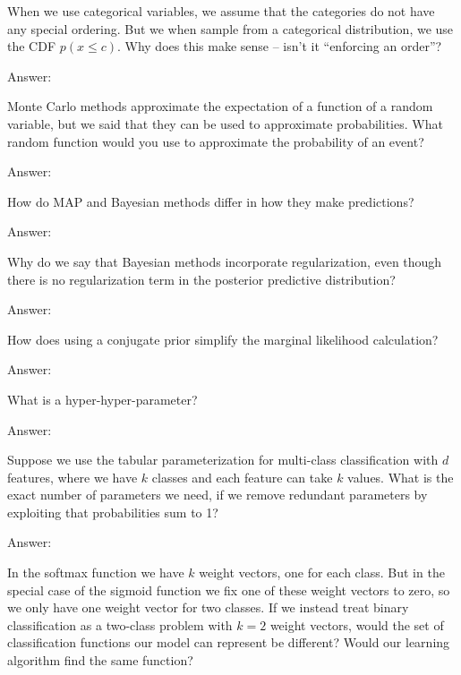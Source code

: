 \documentclass{article}
\newcommand{\ask}[1]{\textcolor{question}{#1}}
\newenvironment{answer}{\par\begingroup\color{answer}Answer: }{\endgroup}
\newcommand{\TODO}{\color{red}{TODO}}
\begin{document}
\begin{qlist}
\item When we use categorical variables, we assume that the categories do not have any special ordering. But we when sample from a categorical distribution, we use the CDF $p(x \leq c)$. \ask{Why does this make sense -- isn't it ``enforcing an order''?}
\begin{answer}\TODO\end{answer}

\item Monte Carlo methods approximate the expectation of a function of a random variable, but we said that they can be used to approximate probabilities. \ask{What random function would you use to approximate the probability of an event?}
\begin{answer}\TODO\end{answer}


\item \ask{How do MAP and Bayesian methods differ in how they make predictions?}
\begin{answer}\TODO\end{answer} 

\item \ask{Why do we say that Bayesian methods incorporate regularization, even though there is no regularization term in the posterior predictive distribution?}
\begin{answer}\TODO\end{answer}


\item \ask{How does using a conjugate prior simplify the marginal likelihood calculation?}
\begin{answer}\TODO\end{answer}

\item \ask{What is a hyper-hyper-parameter?}
\begin{answer}\TODO\end{answer}

\item Suppose we use the tabular parameterization for multi-class classification with $d$ features, where we have $k$ classes and each feature can take $k$ values. \ask{What is the exact number of parameters we need}, if we remove redundant parameters by exploiting that probabilities sum to 1?
\begin{answer}\TODO\end{answer}

\item In the softmax function we have $k$ weight vectors, one for each class. But in the special case of the sigmoid function we fix one of these weight vectors to zero, so we only have one weight vector for two classes. If we instead treat binary classification as a two-class problem with $k = 2$ weight vectors, \ask{would the set of classification functions our model can represent be different? Would our learning algorithm find the same function?}


\end{qlist}
\end{document}
